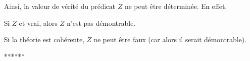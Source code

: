 Ainsi, la valeur de vérité du prédicat $Z$ ne peut être déterminée. 
En effet, 
\startitemize[nowhite]
  \item Si $Z$ et vrai, alors $Z$ n'est pas démontrable.
  \item Si la théorie est cohérente, $Z$ ne peut être faux (car alors il serait démontrable).
\stopitemize

\stopsubsection

\startsubsection[title=Second théorème d'incomplétude de Gödel]

******

\stopsubsection

\stopsection
